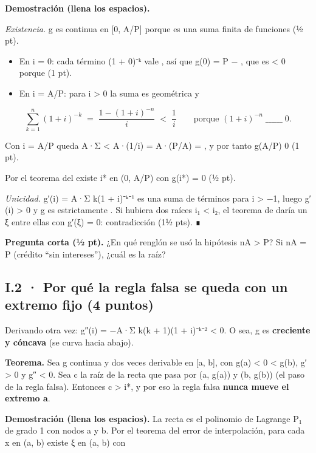 \textbf{Demostración (llena los espacios).}

\emph{Existencia.} g es continua en {[}0, A/P{]} porque es una suma finita de funciones  (½ pt).

\begin{itemize}
\tightlist
\item
  En i = 0: cada término (1 + 0)⁻ᵏ vale  , así que g(0) = P −  , que es \textless{} 0 porque  (1 pt).
\item
  En i = A/P: para i \textgreater{} 0 la suma es geométrica y
\end{itemize}

\[\sum_{k=1}^{n}(1+i)^{-k} \;=\; \frac{1-(1+i)^{-n}}{i} \;<\; \frac{1}{i}
\qquad \text{porque } (1+i)^{-n} \;\_\_\_\_\_\_\; 0 .\]

Con i = A/P queda A·Σ \textless{} A·(1/i) = A·(P/A) =  , y por tanto g(A/P)  0 (1 pt).

Por el teorema del  existe i* en (0, A/P) con g(i*) = 0 (½ pt).

\emph{Unicidad.} g′(i) = A·Σ k(1 + i)⁻ᵏ⁻¹ es una suma de términos  para i \textgreater{} −1, luego g′(i) \textgreater{} 0 y g es estrictamente  . Si hubiera dos raíces i₁ \textless{} i₂, el teorema de  daría un ξ entre ellas con g′(ξ) = 0: contradicción (1½ pts). ∎

\textbf{Pregunta corta (½ pt).} ¿En qué renglón se usó la hipótesis nA \textgreater{} P? Si nA = P (crédito ``sin intereses''), ¿cuál es la raíz?


\subsection{I.2 · Por qué la regla falsa se queda con un extremo fijo (4 puntos)}

Derivando otra vez: g″(i) = −A·Σ k(k + 1)(1 + i)⁻ᵏ⁻² \textless{} 0. O sea, g es \textbf{creciente y cóncava} (se curva hacia abajo).

\textbf{Teorema.} Sea g continua y dos veces derivable en {[}a, b{]}, con g(a) \textless{} 0 \textless{} g(b), g′ \textgreater{} 0 y g″ \textless{} 0. Sea c la raíz de la recta que pasa por (a, g(a)) y (b, g(b)) (el paso de la regla falsa). Entonces c \textgreater{} i*, y por eso la regla falsa \textbf{nunca mueve el extremo a}.

\textbf{Demostración (llena los espacios).} La recta es el polinomio de Lagrange P₁ de grado 1 con nodos a y b. Por el teorema del error de interpolación, para cada x en (a, b) existe ξ en (a, b) con


